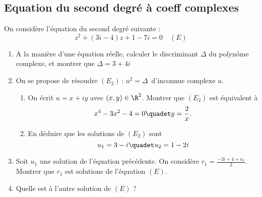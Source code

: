 \subsection{Equation du second degré à coeff complexes}


\begin{exercice}
On considère l'équation du second degré suivante : 
$$z^2+(3i-4)z+1-7i=0 \quad (E) $$

\begin{enumerate}
\item A la manière d'une équation réelle, calculer le discriminant $\Delta$ du polynôme complexe, et montrer que $\Delta=3+4i$
\item On se propose de résoudre $ (E_2) \, : \, u^2=\Delta \, $  d'inconnue complexe $u$. 
\begin{enumerate}
\item On écrit $u=x+iy$ avec $(x,y)\in \R^2$. Montrer que $(E_2)$ est équivalent à 
$$ x^4-3x^2-4=0 \quadet y =\frac{2}{x}.$$
\item En déduire que les solutions de $(E_2)$ sont 
$$u_1=3-i\quadet u_2=1-2i$$
\end{enumerate}
\item Soit $u_1$ une solution de l'équation précédente. 
On considère $r_1 = \frac{-3i+4 +u_1}{2}$. Montrer que $r_1$ est solutions de l'équation  $(E)$.
\item Quelle est à l'autre solution  de  $(E)$ ? 
\end{enumerate}

\end{exercice}

